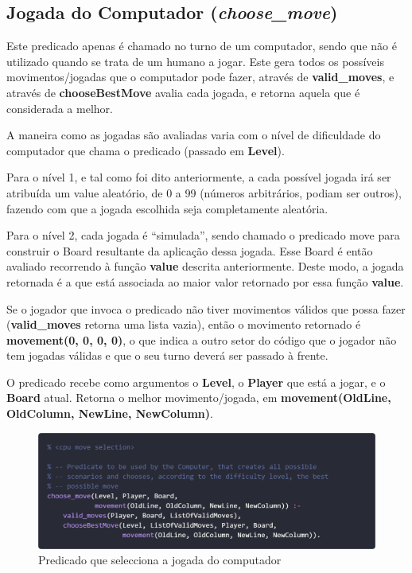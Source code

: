 \documentclass[a4paper]{article}
\begin{document}
\newpage\subsection{Jogada do Computador (\textit{choose\_move})} 

\bigskip
Este predicado apenas é chamado no turno de um computador, sendo que não é utilizado quando se trata de um humano a jogar. Este gera todos os possíveis movimentos/jogadas que o computador pode fazer, através de \textbf{valid\_moves}, e através de \textbf{chooseBestMove} avalia cada jogada, e retorna aquela que é considerada a melhor.

\bigskip
A maneira como as jogadas são avaliadas varia com o nível de dificuldade do computador que chama o predicado (passado em \textbf{Level}). 

\bigskip
Para o nível 1, e tal como foi dito anteriormente, a cada possível jogada irá ser atribuída um value aleatório, de 0 a 99 (números arbitrários, podiam ser outros), fazendo com que a jogada escolhida seja completamente aleatória. 

\bigskip	
Para o nível 2, cada jogada é “simulada”, sendo chamado o predicado move para construir o Board resultante da aplicação dessa jogada. Esse Board é então avaliado recorrendo à função \textbf{value} descrita anteriormente. Deste modo, a jogada retornada é a que está associada ao maior valor retornado por essa função \textbf{value}.

\bigskip
Se o jogador que invoca o predicado não tiver movimentos válidos que possa fazer (\textbf{valid\_moves} retorna uma lista vazia), então o movimento retornado é \textbf{movement(0, 0, 0, 0)}, o que indica a outro setor do código que o jogador não tem jogadas válidas e que o seu turno deverá ser passado à frente.

\bigskip
O predicado recebe como argumentos o \textbf{Level}, o \textbf{Player} que está a jogar, e o \textbf{Board} atual. Retorna o melhor movimento/jogada, em \textbf{movement(OldLine, OldColumn, NewLine, NewColumn)}.

\bigskip
\begin{figure}[hbp!]
    \centering
    \includegraphics[width=\linewidth]{prints/move-selection-1.png}
    \caption{Predicado que selecciona a jogada do computador}
    \label{fig}
\end{figure}
\end{document}

